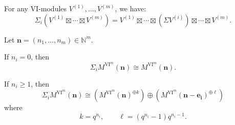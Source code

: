 \documentclass{amsart}
\numberwithin{equation}{section}
\newcommand{\N}{{\mathbb{N}}}
\newcommand{\VI}{{\mathrm{VI}}}
\begin{document}
For any $\VI$-modules $V^{(1)}, \ldots, V^{(m)}$, we have:
\begin{equation}\label{eq: tensor2}
\Sigma_i\left( V^{(1)}\boxtimes \cdots\boxtimes V^{(m)} \right) 
= V^{(1)}\boxtimes \cdots \boxtimes \left( \Sigma V^{(i)} \right) \boxtimes \cdots\boxtimes V^{(m)}. 
\end{equation}


\begin{proposition} \label{prop:shift_of_free}
   Let $\mathbf{n}=(n_1, \ldots, n_m)\in \N^m$. 
   
   If $n_i=0$, then 
      \[ \Sigma_i M^{\VI^m}(\mathbf{n}) \cong M^{\VI^m}(\mathbf{n}). \]
   
   If $n_i\geqslant 1$, then
      \[ \Sigma_i M^{\VI^m}(\mathbf{n}) \cong \left( M^{\VI^m}(\mathbf{n})^{\oplus k} \right) \oplus 
      \left( M^{\VI^m}(\mathbf{n}-\mathbf{e_i})^{\oplus \ell} \right) \]
   where 
   \[ k=q^{n_i}, \qquad \ell=(q^{n_i}-1)q^{{n_i}-1}. \]
\end{proposition}
\end{document}
